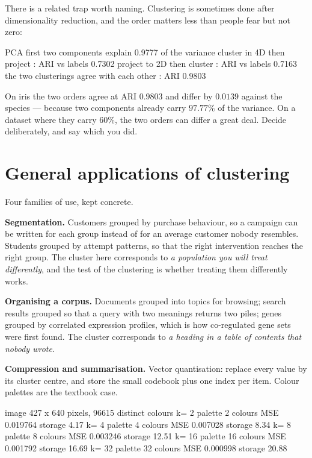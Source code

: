 \documentclass[11pt]{article}
\begin{document}
There is a related trap worth naming. Clustering is sometimes done after
dimensionality reduction, and the order matters less than people fear but not
zero:

\begin{codeout}
PCA first two components explain 0.9777 of the variance
cluster in 4D then project : ARI vs labels 0.7302
project to 2D then cluster : ARI vs labels 0.7163
the two clusterings agree with each other : ARI 0.9803
\end{codeout}

On iris the two orders agree at ARI $0.9803$ and differ by $0.0139$ against
the species --- because two components already carry $97.77\%$ of the
variance. On a dataset where they carry $60\%$, the two orders can differ a
great deal. Decide deliberately, and say which you did.

\notesources{\AMLUnitVIISources}

\section{General applications of clustering}
\label{sec:apps}

Four families of use, kept concrete.

\textbf{Segmentation.} Customers grouped by purchase behaviour, so a campaign
can be written for each group instead of for an average customer nobody
resembles. Students grouped by attempt patterns, so that the right
intervention reaches the right group. The cluster here corresponds to
\emph{a population you will treat differently}, and the test of the clustering
is whether treating them differently works.

\textbf{Organising a corpus.} Documents grouped into topics for browsing;
search results grouped so that a query with two meanings returns two piles;
genes grouped by correlated expression profiles, which is how co-regulated
gene sets were first found. The cluster corresponds to \emph{a heading in a
table of contents that nobody wrote}.

\textbf{Compression and summarisation.} Vector quantisation: replace every
value by its cluster centre, and store the small codebook plus one index per
item. Colour palettes are the textbook case.

\begin{codeout}
image 427 x 640 pixels, 96615 distinct colours
   k=  2  palette   2 colours  MSE 0.019764  storage  4.17%
   k=  4  palette   4 colours  MSE 0.007028  storage  8.34%
   k=  8  palette   8 colours  MSE 0.003246  storage 12.51%
   k= 16  palette  16 colours  MSE 0.001792  storage 16.69%
   k= 32  palette  32 colours  MSE 0.000998  storage 20.88%
\end{codeout}
\end{document}
